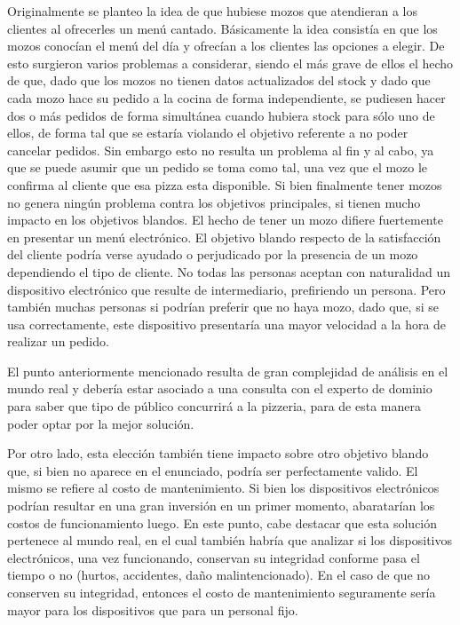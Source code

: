 \documentclass[a4paper,10pt]{article}
\begin{document}
Originalmente se planteo la idea de que hubiese mozos que atendieran a los clientes al ofrecerles un menú cantado.
 Básicamente la idea consistía en que los mozos conocían el menú del día y ofrecían a los clientes las opciones a elegir.
 De esto surgieron varios problemas a considerar, siendo el más grave de ellos el hecho de que, dado que los mozos no tienen datos
 actualizados del stock y dado que cada mozo hace su pedido a la cocina de forma independiente, se pudiesen hacer dos o más pedidos de
 forma simultánea cuando hubiera stock para sólo uno de ellos, de forma tal que se estaría violando el objetivo referente a no poder 
cancelar pedidos. Sin embargo esto no resulta un problema al fin y al cabo, ya que se puede asumir que un pedido se toma como tal, una vez
que el mozo le confirma al cliente que esa pizza esta disponible. Si bien finalmente tener mozos no genera ning\'un problema contra los objetivos
principales, si tienen mucho impacto en los objetivos blandos. El hecho de tener un mozo difiere fuertemente en presentar un men\'u electr\'onico.
El objetivo blando respecto de la satisfacci\'on del cliente podr\'ia verse ayudado o perjudicado por la presencia de un mozo dependiendo el
tipo de cliente. No todas las personas aceptan con naturalidad un dispositivo electr\'onico que resulte de intermediario, prefiriendo un persona. Pero
tambi\'en muchas personas si podr\'ian preferir que no haya mozo, dado que, si se usa correctamente, este dispositivo presentar\'ia una mayor velocidad
a la hora de realizar un pedido.

El punto anteriormente mencionado resulta de gran complejidad de an\'alisis en el mundo real y deber\'ia estar asociado a una consulta con el
experto de dominio para saber que tipo de p\'ublico concurrir\'a a la pizzeria, para de esta manera poder optar por la mejor soluci\'on.

Por otro lado, esta elecci\'on tambi\'en tiene impacto sobre otro objetivo blando que, si bien no aparece en el enunciado, podr\'ia ser perfectamente valido.
El mismo se refiere al costo de mantenimiento. Si bien los dispositivos electr\'onicos podr\'ian resultar en una gran inversi\'on en un primer momento,
abaratar\'ian los costos de funcionamiento luego. En este punto, cabe destacar que esta soluci\'on pertenece al mundo real, en el cual tambi\'en
habr\'ia que analizar si los dispositivos electr\'onicos, una vez funcionando, conservan su integridad conforme pasa el tiempo o no (hurtos, accidentes, da\~{n}o malintencionado).
En el caso de que no conserven su integridad, entonces el costo de mantenimiento seguramente ser\'ia mayor para los dispositivos que para un personal fijo.
\end{document}
